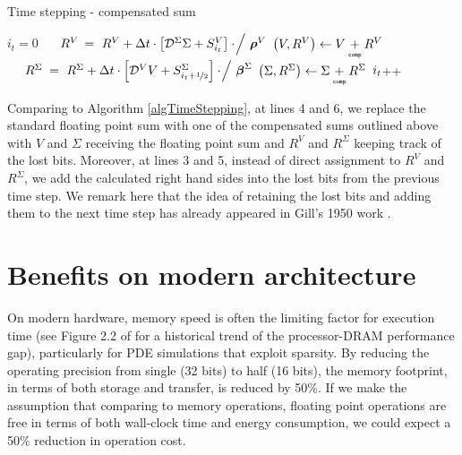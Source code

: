 \documentclass[10pt]{article}
\begin{document}
\begin{algorithm}[H]
\caption{Time stepping - compensated sum}
\label{algTimeSteppingComSum}
\begin{algorithmic}[1]
\State $i_t=0$
\State $\hphantom{\hspace{1.35em}}\mathrlap{R^V} \quad\enskip\, = \ R^V + \Delta t \cdot \left[\mathcal D^\Sigma \Sigma + S^V_{i_t} \right] \cdot\!\Big/ \ \boldsymbol \rho^V$ 
%
\State $\left(V, R^V\right) \gets V \underset{\texttt{\tiny comp}}{+} R^V$ 
%
\State $\hphantom{\hspace{1.35em}}\mathrlap{R^\Sigma} \quad\enskip\, = \ R^\Sigma + \Delta t \cdot \left[\mathcal D^V V + S^\Sigma_{i_t + \nicefrac{1}{2}} \right] \cdot\!\Big/ \ \boldsymbol \beta^\Sigma$
%
\State $\left(\Sigma, R^\Sigma\right) \gets \Sigma \underset{\texttt{\tiny comp}}{+} R^\Sigma$ 
%
\State $\hphantom{\hspace{0.75em}}\mathllap{i_t}$++ 
%
\EndWhile
\end{algorithmic}
\end{algorithm}

Comparing to Algorithm \ref{algTimeStepping}, at lines 4 and 6, we replace the standard floating point sum with one of the compensated sums outlined above with $V$ and $\Sigma$ receiving the floating point sum and $R^V$ and $R^\Sigma$ keeping track of the lost bits. 
%
Moreover, at lines 3 and 5, instead of direct assignment to $R^V$ and $R^\Sigma$, we add the calculated right hand sides into the lost bits from the previous time step.
%
We remark here that the idea of retaining the lost bits and adding them to the next time step has already appeared in Gill's 1950 work \cite[p.~103]{gill1951process}.


\section{Benefits on modern architecture}\label{sec_benefits}
%
On modern hardware, memory speed is often the limiting factor for execution time (see Figure 2.2 of \cite[p.80]{Hennessy2015computer} for a historical trend of the processor-DRAM performance gap), particularly for PDE simulations that exploit sparsity.
%
By reducing the operating precision from single (32 bits) to half (16 bits), the memory footprint, in terms of both storage and transfer, is reduced by 50\%. If we make the assumption that comparing to memory operations, floating point operations are free in terms of both wall-clock time and energy consumption, we could expect a 50\% reduction in operation cost.
%
\end{document}
